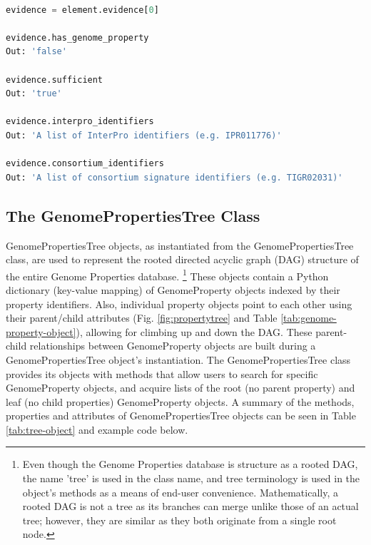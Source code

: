 \begin{lstlisting}[language=Python]

evidence = element.evidence[0]
	
evidence.has_genome_property
Out: 'false'

evidence.sufficient
Out: 'true'

evidence.interpro_identifiers
Out: 'A list of InterPro identifiers (e.g. IPR011776)'

evidence.consortium_identifiers 
Out: 'A list of consortium signature identifiers (e.g. TIGR02031)'

\end{lstlisting}

\subsection{The GenomePropertiesTree Class} \label{GenomePropertiesTree-Class}

GenomePropertiesTree objects, as instantiated from the GenomePropertiesTree class, are used to represent the rooted directed acyclic graph (DAG) structure of the entire Genome Properties database. \footnote{Even though the Genome Properties database is structure as a rooted DAG, the name 'tree' is used in the class name, and tree terminology is used in the object's methods as a means of end-user convenience. Mathematically, a rooted DAG is not a tree as its branches can merge unlike those of an actual tree; however, they are similar as they both originate from a single root node.} These objects contain a Python dictionary (key-value mapping) of GenomeProperty objects indexed by their property identifiers. Also, individual property objects point to each other using their parent/child attributes (Fig. \ref{fig:propertytree} and Table \ref{tab:genome-property-object}), allowing for climbing up and down the DAG. These parent-child relationships between GenomeProperty objects are built during a GenomePropertiesTree object's instantiation. The GenomePropertiesTree class provides its objects with methods that allow users to search for specific GenomeProperty objects, and acquire lists of the root (no parent property) and leaf (no child properties) GenomeProperty objects. A summary of the methods, properties and attributes of GenomePropertiesTree objects can be seen in Table \ref{tab:tree-object} and example code below.

